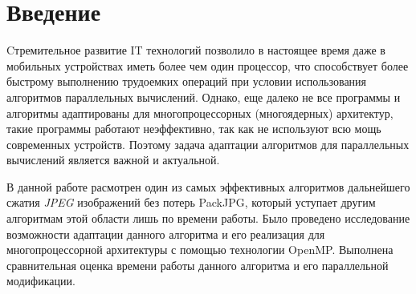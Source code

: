 \documentclass{matmex-diploma-custom}
\begin{document}
\maketitle
\tableofcontents
\newpage
\section*{Введение}

    Cтремительное развитие IT технологий позволило в настоящее время даже в мобильных устройствах иметь более чем один процессор, что способствует более быстрому выполнению трудоемких операций при условии использования алгоритмов параллельных вычислений. Однако, еще далеко не все программы и алгоритмы адаптированы для многопроцессорных (многоядерных) архитектур, такие программы работают неэффективно, так как не используют всю мощь современных устройств. Поэтому задача адаптации алгоритмов для параллельных вычислений является важной и актуальной.

 В данной работе расмотрен один из самых эффективных алгоритмов дальнейшего сжатия \emph{JPEG} изображений без потерь PackJPG, который уступает другим алгоритмам этой области лишь по времени работы. Было проведено исследование возможности адаптации данного алгоритма и его реализация для многопроцессорной архитектуры с помощью технологии OpenMP. Выполнена сравнительная оценка времени работы данного алгоритма и его параллельной модификации.
\end{document}

